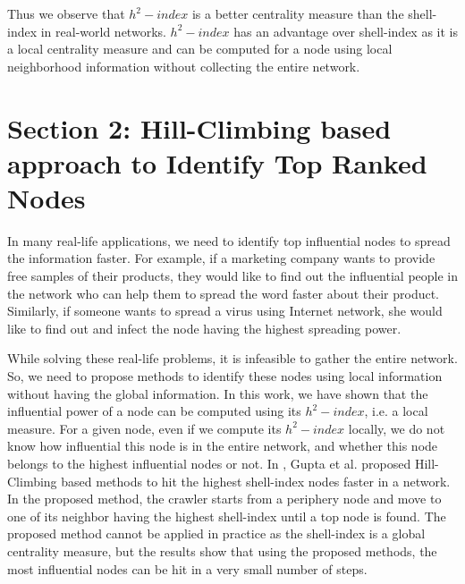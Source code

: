 \documentclass[conference]{IEEEtran}
\begin{document}
Thus we observe that $h^2-index$ is a better centrality measure than the shell-index in real-world networks. $h^2-index$ has an advantage over shell-index as it is a local centrality measure and can be computed for a node using local neighborhood information without collecting the entire network.

\section{Section 2: Hill-Climbing based approach to Identify Top Ranked Nodes}\label{sec2}

In many real-life applications, we need to identify top influential nodes to spread the information faster. For example, if a marketing company wants to provide free samples of their products, they would like to find out the influential people in the network who can help them to spread the word faster about their product. Similarly, if someone wants to spread a virus using Internet network, she would like to find out and infect the node having the highest spreading power. 

While solving these real-life problems, it is infeasible to gather the entire network. So, we need to propose methods to identify these nodes using local information without having the global information. 
In this work, we have shown that the influential power of a node can be computed using its $h^2-index$, i.e. a local measure. For a given node, even if we compute its $h^2-index$ locally, we do not know how influential this node is in the entire network, and whether this node belongs to the highest influential nodes or not. In \cite{gupta2016pseudo}, Gupta et al. proposed Hill-Climbing based methods to hit the highest shell-index nodes faster in a network. In the proposed method, the crawler starts from a periphery node and move to one of its neighbor having the highest shell-index until a top node is found. The proposed method cannot be applied in practice as the shell-index is a global centrality measure, but the results show that using the proposed methods, the most influential nodes can be hit in a very small number of steps.  %
\end{document}

